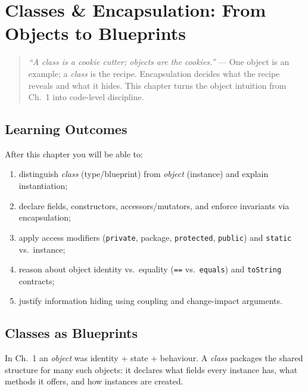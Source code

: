 \chapter{Classes \& Encapsulation: From Objects to Blueprints}
\label{ch:classes}

\begin{quote}
\emph{``A class is a cookie cutter; objects are the cookies.''} --- One object is an example; a \emph{class} is the recipe. Encapsulation decides what the recipe reveals and what it hides. This chapter turns the object intuition from Ch.~1 into code-level discipline.
\end{quote}

\noindent{}
\vspace{0.4em}

\section*{Learning Outcomes}
After this chapter you will be able to:
\begin{enumerate}[label=(L\arabic*)]
    \item distinguish \emph{class} (type/blueprint) from \emph{object} (instance) and explain instantiation;
    \item declare fields, constructors, accessors/mutators, and enforce invariants via encapsulation;
    \item apply access modifiers (\texttt{private}, package, \texttt{protected}, \texttt{public}) and \texttt{static} vs.\ instance;
    \item reason about object identity vs.\ equality (\texttt{==} vs.\ \texttt{equals}) and \texttt{toString} contracts;
    \item justify information hiding using coupling and change-impact arguments.
\end{enumerate}

\section{Classes as Blueprints}
\label{sec:blueprints}
In Ch.~1 an \emph{object} was identity + state + behaviour. A \emph{class} packages the shared structure for many such objects: it declares what fields every instance has, what methods it offers, and how instances are created.

